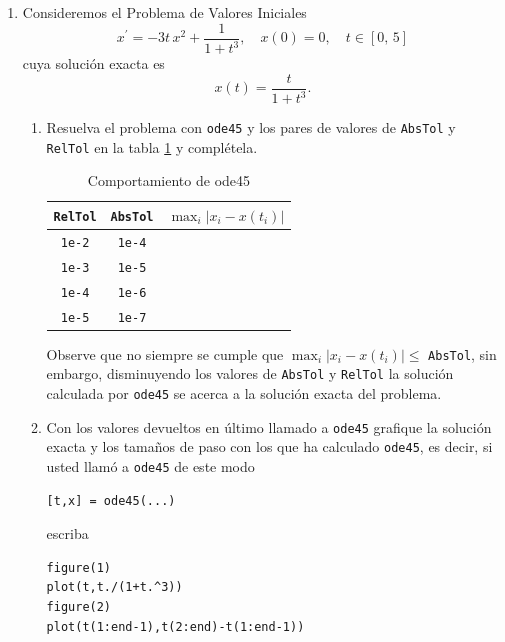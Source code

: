\documentclass[letter,11pt]{article}
\begin{document}
\begin{enumerate}
\item Consideremos el Problema de Valores Iniciales
\begin{equation*}
x^{\prime} = -3t\,x^2 + \frac{1}{1+t^3},\quad x(0) = 0,\quad t \in [0,\,5]
\end{equation*}
cuya soluci\'on exacta es
\[
x(t) = \frac{t}{1+t^3}.
\]
\begin{enumerate}
\item Resuelva el problema con \texttt{ode45} y los pares de valores de
\texttt{AbsTol} y \texttt{RelTol} en la tabla \ref{tab:ej2} y compl\'etela.

\begin{table}[h]
\begin{center}
\begin{tabular}{|c|c|c|}\hline
\texttt{RelTol} & \texttt{AbsTol} & $\max_{i} |x_i - x(t_i)|$\\\hline
\texttt{1e-2} & \texttt{1e-4} & \\\hline
\texttt{1e-3} & \texttt{1e-5} & \\\hline
\texttt{1e-4} & \texttt{1e-6} & \\\hline
\texttt{1e-5} & \texttt{1e-7} & \\\hline
\end{tabular}
\end{center}
\caption{Comportamiento de ode45}\label{tab:ej2}
\end{table}

\noindent Observe que no siempre se cumple que $\max_i |x_i - x(t_i)| \le $ \texttt{AbsTol}, sin embargo, dis\-mi\-nu\-yen\-do los valores de \texttt{AbsTol} y \texttt{RelTol} la soluci\'on calculada
por \texttt{ode45} se acerca a la soluci\'on exacta del problema.

\item Con los valores devueltos en \'ultimo llamado a \texttt{ode45}
grafique la soluci\'on exacta y los tama\~nos de paso con los que ha calculado
\texttt{ode45}, es decir, si usted llam\'o a \texttt{ode45} de este modo

\medskip
\begin{lstlisting}
[t,x] = ode45(...)
\end{lstlisting}
\medskip

\noindent escriba

\medskip
\begin{lstlisting}
figure(1)
plot(t,t./(1+t.^3))
figure(2)
plot(t(1:end-1),t(2:end)-t(1:end-1))
\end{lstlisting}
\medskip


\end{enumerate}
\end{enumerate}
\end{document}
